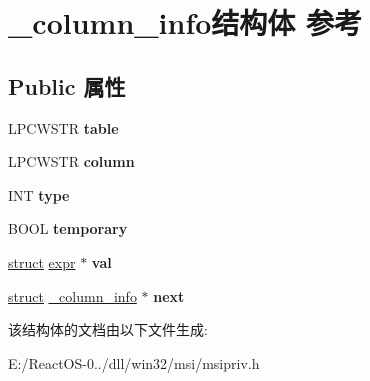 \hypertarget{struct__column__info}{}\section{\+\_\+column\+\_\+info结构体 参考}
\label{struct__column__info}
\subsection*{Public 属性}
\begin{DoxyCompactItemize}
\item 
\mbox{\label{struct__column__info_afd62b661ae6f5ded5be7a7d54952450f}} 
L\+P\+C\+W\+S\+TR {\bfseries table}
\item 
\mbox{\label{struct__column__info_a6e60f4cad40c3d0e66ff02b6e086c739}} 
L\+P\+C\+W\+S\+TR {\bfseries column}
\item 
\mbox{\label{struct__column__info_a6cda466a0ec5d7cd4334637c0a1d4653}} 
I\+NT {\bfseries type}
\item 
\mbox{\label{struct__column__info_a87bbcc8b62a99699996d1ee2db9f381d}} 
B\+O\+OL {\bfseries temporary}
\item 
\mbox{\label{struct__column__info_ae2bdfb4dba8f7264517651e74b25bdc6}} 
\hyperlink{interfacestruct}{struct} \hyperlink{structexpr}{expr} $\ast$ {\bfseries val}
\item 
\mbox{\label{struct__column__info_a630b44e66317ae2180364c5385c7fadc}} 
\hyperlink{interfacestruct}{struct} \hyperlink{struct__column__info}{\+\_\+column\+\_\+info} $\ast$ {\bfseries next}
\end{DoxyCompactItemize}


该结构体的文档由以下文件生成\+:\begin{DoxyCompactItemize}
\item 
E\+:/\+React\+O\+S-\/0../dll/win32/msi/msipriv.\+h\end{DoxyCompactItemize}
